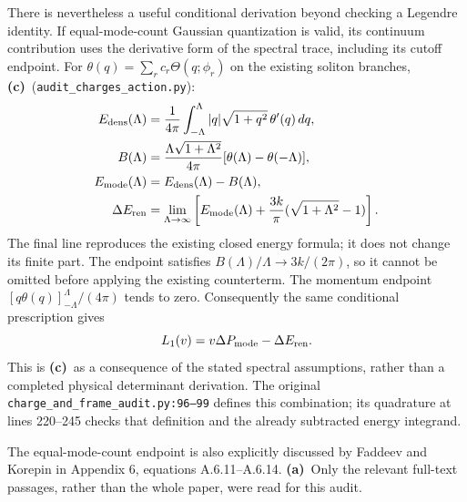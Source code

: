 \documentclass[11pt,a4paper]{article}
\newcommand{\Lc}{\textbf{(c)}}
\newcommand{\La}{\textbf{(a)}}
\newcommand{\scr}{\texttt{audit\_\allowbreak charges\_\allowbreak action.py}}
\begin{document}
There is nevertheless a useful conditional derivation beyond checking a
Legendre identity. If equal-mode-count Gaussian quantization is valid, its
continuum contribution uses the derivative form of the spectral trace,
including its cutoff endpoint. For $\theta(q)=\sum_r c_r\Theta(q;\phi_r)$
on the existing soliton branches, \Lc\ (\scr):
\begin{align}
 E_{\rm dens}(\Lambda)&=\frac1{4\pi}\int_{-\Lambda}^{\Lambda}
          |q|\sqrt{1+q^2}\,\theta'(q)\,dq,\\
 B(\Lambda)&=\frac{\Lambda\sqrt{1+\Lambda^2}}{4\pi}
                   [\theta(\Lambda)-\theta(-\Lambda)],\\
 E_{\rm mode}(\Lambda)&=E_{\rm dens}(\Lambda)-B(\Lambda),\\
 \Delta E_{\rm ren}&=\lim_{\Lambda\to\infty}
 \left[E_{\rm mode}(\Lambda)+\frac{3k}{\pi}
                   (\sqrt{1+\Lambda^2}-1)\right].
 \label{eq:regulated}
\end{align}
The final line reproduces the existing closed energy formula; it does not
change its finite part. The endpoint satisfies
$B(\Lambda)/\Lambda\to3k/(2\pi)$, so it cannot be omitted before applying
the existing counterterm. The momentum endpoint
$[q\theta(q)]_{-\Lambda}^{\Lambda}/(4\pi)$ tends to zero. Consequently
the same conditional prescription gives
\begin{equation}
 L_1(v)=v\Delta P_{\rm mode}-\Delta E_{\rm ren}.
 \label{eq:conditionalL}
\end{equation}
This is \Lc\ as a consequence of the stated spectral assumptions, rather
than a completed physical determinant derivation. The original
\texttt{charge\_and\_frame\_audit.py:96--99} defines this combination;
its quadrature at lines 220--245 checks that definition and the already
subtracted energy integrand.

The equal-mode-count endpoint is also explicitly discussed by Faddeev and
Korepin in Appendix 6, equations A.6.11--A.6.14. \La\ Only the relevant
full-text passages, rather than the whole paper, were read for this audit.
\end{document}
